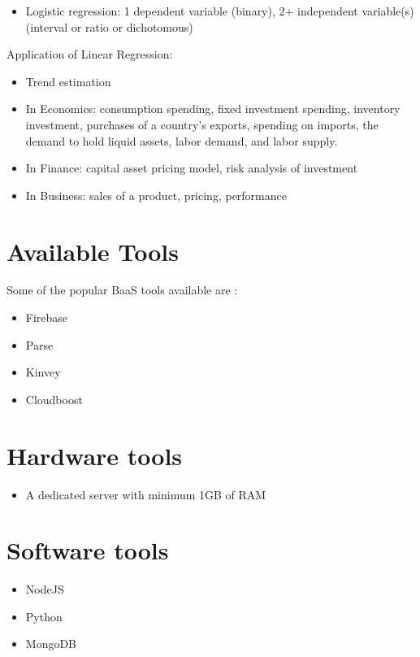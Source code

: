 \documentclass[a4paper,12pt]{report}
\begin{document}
\begin{enumerate}
\begin{itemize}
    		\item Logistic regression:
    		1 dependent variable (binary), 2+ independent variable(s) (interval or ratio or dichotomous)     
    	\end{itemize}
    	Application of Linear Regression:
    	\begin{itemize}
    		\item Trend estimation
    		\item In Economics:  consumption spending, fixed investment spending, inventory investment, purchases of a country's exports, spending on imports, the demand to hold liquid assets, labor demand, and labor supply.
    		\item In Finance: capital asset pricing model, risk analysis of investment
    		\item In Business: sales of a product, pricing, performance      
    	\end{itemize}
    
    	
    \end{enumerate}
    \section{Available Tools}
    Some of the popular BaaS tools available are :
    \begin{itemize}
    \item Firebase
    \item Parse
    \item Kinvey
    \item Cloudboost
    \end{itemize}
    
    \section{Hardware tools}    
    \begin{itemize}
    \item A dedicated server with minimum 1GB of RAM
    \end{itemize}

    \section{Software tools}    
    \begin{itemize}
    \item NodeJS     
    \item Python
    \item MongoDB
    \end{itemize}
            
\end{document}
